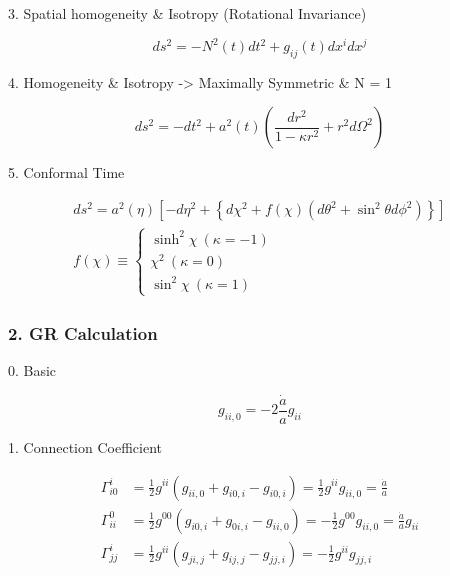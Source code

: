 \documentclass[10pt]{article}
\begin{document}
3. Spatial homogeneity \& Isotropy (Rotational Invariance)

\begin{equation}
ds^2 = -N^2(t)dt^2 + g_{ij}(t)dx^idx^j
\end{equation}

4. Homogeneity \& Isotropy -\textgreater{} Maximally Symmetric \& N = 1

\begin{equation}
ds^2 = -dt^2 + a^2(t)\left(\frac{dr^2}{1-\kappa r^2} + r^2d\Omega^2\right)
\end{equation}

5. Conformal Time

\begin{equation}
\begin{gathered}
ds^2 = a^2(\eta)\left[-d\eta^2 + \left\{d\chi^2 + f(\chi)(d\theta^2 + \sin^2\theta d\phi^2)\right\}\right] \\
f(\chi) \equiv
\begin{cases}
\sinh^2\chi ~ (\kappa=-1) \\
\chi^2 ~ (\kappa = 0) \\
\sin^2\chi ~ (\kappa = 1)
\end{cases}
\end{gathered}
\end{equation}

\subsubsection*{2. GR Calculation}

{\label{315398}}\par\null

0. Basic

\begin{equation}
g_{ii,0} = -2\frac{\dot{a}}{a}g_{ii}
\end{equation}

1. Connection Coefficient

\begin{equation}
\begin{aligned}
\Gamma^i_{i0} &= \frac{1}{2}g^{ii}(g_{ii,0}+g_{i0,i}-g_{i0,i}) = \frac{1}{2} g^{ii} g_{ii,0} = \frac{\dot{a}}{a} \\
\Gamma^0_{ii} &= \frac{1}{2}g^{00}(g_{i0,i}+g_{0i,i}-g_{ii,0}) = -\frac{1}{2}g^{00}g_{ii,0} = \frac{\dot{a}}{a}g_{ii} \\
\Gamma^i_{jj} &= \frac{1}{2}g^{ii}(g_{ji,j}+g_{ij,j} - g_{jj,i}) = -\frac{1}{2}g^{ii}g_{jj,i}\\
\end{aligned}
\end{equation}
\end{document}

